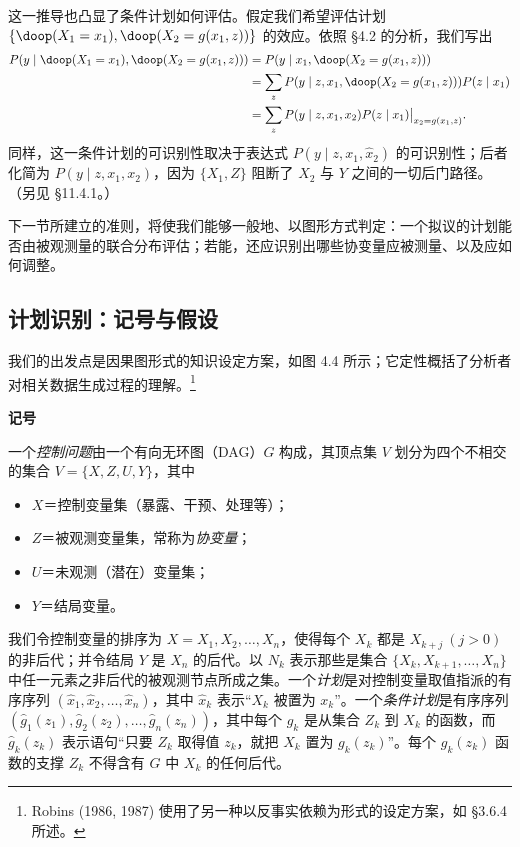 这一推导也凸显了条件计划如何评估。假定我们希望评估计划 $\{\doop(X_1=x_1),\doop(X_2=g(x_1,z))\}$ 的效应。依照 \S 4.2 的分析，我们写出
\begin{equation*}
\begin{aligned}
P(y\mid\doop(X_1=x_1),\doop(X_2=g(x_1,z))) &= P(y\mid x_1,\doop(X_2=g(x_1,z)))\\
&= \sum_z P(y\mid z,x_1,\doop(X_2=g(x_1,z)))P(z\mid x_1)\\
&= \sum_z P(y\mid z,x_1,x_2)P(z\mid x_1)\big|_{x_2=g(x_1,z)}.
\end{aligned}
\end{equation*}
同样，这一条件计划的可识别性取决于表达式 $P(y\mid z,x_1,\hat{x}_2)$ 的可识别性；后者化简为 $P(y\mid z,x_1,x_2)$，因为 $\{X_1,Z\}$ 阻断了 $X_2$ 与 $Y$ 之间的一切后门路径。（另见 \S 11.4.1。）

下一节所建立的准则，将使我们能够一般地、以图形方式判定：一个拟议的计划能否由被观测量的联合分布评估；若能，还应识别出哪些协变量应被测量、以及应如何调整。

\subsection{计划识别：记号与假设}

我们的出发点是因果图形式的知识设定方案，如图 4.4 所示；它定性概括了分析者对相关数据生成过程的理解。\footnote{Robins (1986, 1987) 使用了另一种以反事实依赖为形式的设定方案，如 \S 3.6.4 所述。}

\medskip
\noindent\textbf{记号}

一个\emph{控制问题}由一个有向无环图（DAG）$G$ 构成，其顶点集 $V$ 划分为四个不相交的集合 $V=\{X,Z,U,Y\}$，其中
\begin{itemize}
\item $X$＝控制变量集（暴露、干预、处理等）；
\item $Z$＝被观测变量集，常称为\emph{协变量}；
\item $U$＝未观测（潜在）变量集；
\item $Y$＝结局变量。
\end{itemize}

我们令控制变量的排序为 $X=X_1,X_2,\dots,X_n$，使得每个 $X_k$ 都是 $X_{k+j}\ (j>0)$ 的非后代；并令结局 $Y$ 是 $X_n$ 的后代。以 $N_k$ 表示那些是集合 $\{X_k,X_{k+1},\dots,X_n\}$ 中任一元素之非后代的被观测节点所成之集。一个\emph{计划}是对控制变量取值指派的有序序列 $(\hat{x}_1,\hat{x}_2,\dots,\hat{x}_n)$，其中 $\hat{x}_k$ 表示“$X_k$ 被置为 $x_k$”。一个\emph{条件计划}是有序序列 $(\hat{g}_1(z_1),\hat{g}_2(z_2),\dots,\hat{g}_n(z_n))$，其中每个 $g_k$ 是从集合 $Z_k$ 到 $X_k$ 的函数，而 $\hat{g}_k(z_k)$ 表示语句“只要 $Z_k$ 取得值 $z_k$，就把 $X_k$ 置为 $g_k(z_k)$”。每个 $g_k(z_k)$ 函数的支撑 $Z_k$ 不得含有 $G$ 中 $X_k$ 的任何后代。

